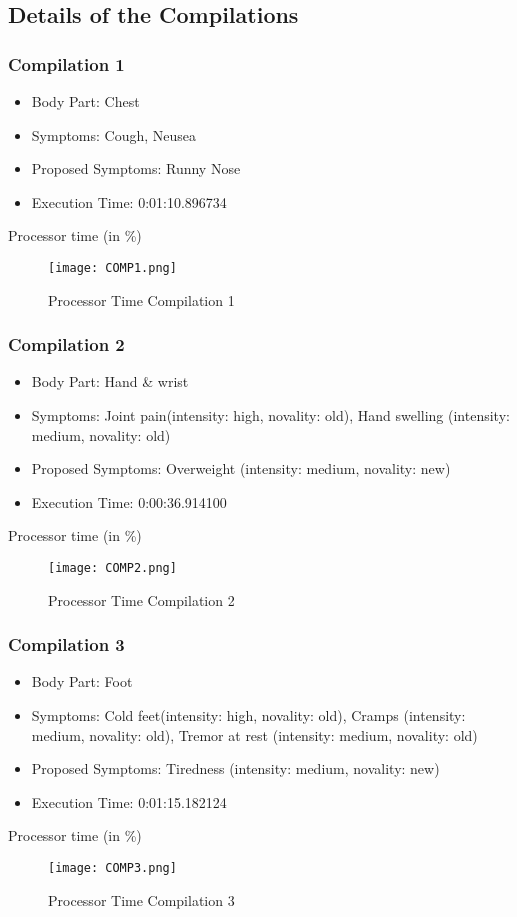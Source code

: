 \subsection{Details of the Compilations}
\subsubsection{Compilation 1}
\begin{itemize}
	\item Body Part: Chest
	\item Symptoms: Cough, Neusea
	\item Proposed Symptoms: Runny Nose
	\item Execution Time: 0:01:10.896734
\end{itemize}
Processor time (in \%)
\begin{figure}[H]
	\centering
	\texttt{[image: COMP1.png]}
	\caption{Processor Time Compilation 1}
\end{figure}

\pagebreak
\subsubsection{Compilation 2}
\begin{itemize}
	\item Body Part: Hand \& wrist 
	\item Symptoms: Joint pain(intensity: high, novality: old), Hand swelling (intensity: medium, novality: old)
	\item Proposed Symptoms: Overweight (intensity: medium, novality: new)
	\item Execution Time: 0:00:36.914100
\end{itemize}
Processor time (in \%)
\begin{figure}[H]
	\centering
	\texttt{[image: COMP2.png]}
	\caption{Processor Time Compilation 2}
\end{figure}

\pagebreak
\subsubsection{Compilation 3}
\begin{itemize}
	\item Body Part: Foot
	\item Symptoms: Cold feet(intensity: high, novality: old), Cramps  (intensity: medium, novality: old), Tremor at rest  (intensity: medium, novality: old)
	\item Proposed Symptoms: Tiredness (intensity: medium, novality: new)
	\item Execution Time: 0:01:15.182124
\end{itemize}
Processor time (in \%)
\begin{figure}[H]
	\centering
	\texttt{[image: COMP3.png]}
	\caption{Processor Time Compilation 3}
\end{figure}

